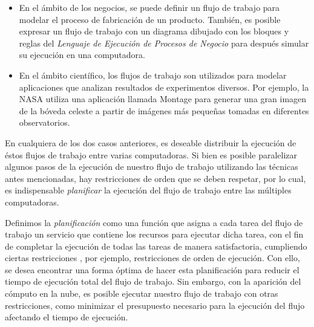 \begin{itemize}
\item{En el ámbito de los negocios, se puede definir un flujo de trabajo para modelar el proceso de fabricación de un producto. También, es posible expresar un flujo de trabajo con un diagrama dibujado con los bloques y reglas del \emph{Lenguaje de Ejecución de Procesos de Negocio} para después simular su ejecución en una computadora.}

\item{En el ámbito científico, los flujos de trabajo son utilizados para modelar aplicaciones que analizan resultados de experimentos diversos. Por ejemplo, la NASA utiliza una aplicación llamada Montage para generar una gran imagen de la bóveda celeste a partir de imágenes más pequeñas tomadas en diferentes observatorios.}
\end{itemize}

En cualquiera de los dos casos anteriores, es deseable distribuir la ejecución de éstos flujos de trabajo entre varias computadoras. Si bien es posible paralelizar algunos pasos de la ejecución de nuestro flujo de trabajo utilizando las técnicas antes mencionadas, hay restricciones de orden que se deben respetar, por lo cual, es indispensable \emph{planificar} la ejecución del flujo de trabajo entre las múltiples computadoras.

Definimos la \emph{planificación} como una función que asigna a cada tarea del flujo de trabajo un servicio que contiene los recursos para ejecutar dicha tarea, con el fin de completar la ejecución de todas las tareas de manera satisfactoria, cumpliendo ciertas restricciones \cite{wieczorek2009towards}, por ejemplo, restricciones de orden de ejecución. Con ello, se desea encontrar una forma óptima de hacer esta planificación para reducir el tiempo de ejecución total del flujo de trabajo. Sin embargo, con la aparición del cómputo en la nube, es posible ejecutar nuestro flujo de trabajo con otras restricciones, como minimizar el presupuesto necesario para la ejecución del flujo afectando el tiempo de ejecución.

